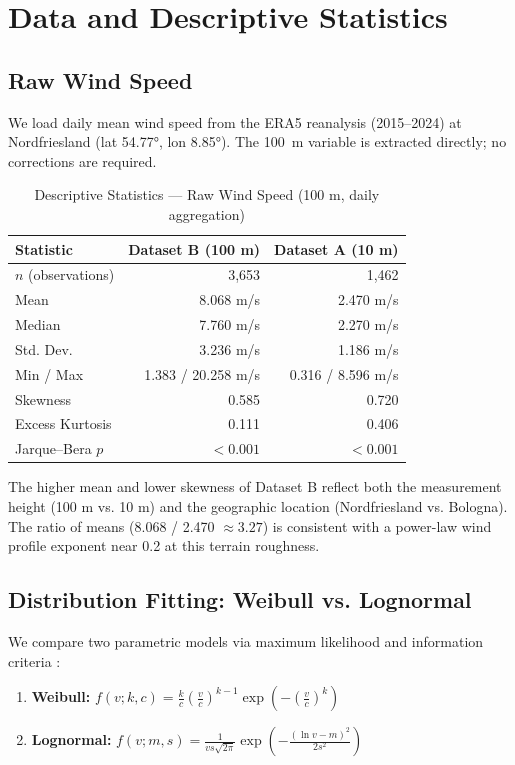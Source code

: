 \documentclass[11pt]{article}
\begin{document}
\section{Data and Descriptive Statistics}

\subsection{Raw Wind Speed}

We load daily mean wind speed from the ERA5 reanalysis (2015--2024) at Nordfriesland (lat 54.77°, lon 8.85°). The 100~m variable is extracted directly; no corrections are required.

\begin{table}[h]
\centering
\caption{Descriptive Statistics --- Raw Wind Speed (100 m, daily aggregation)}
\label{tab:rawstats}
\begin{tabular}{lrr}
\toprule
\textbf{Statistic} & \textbf{Dataset B (100 m)} & \textbf{Dataset A (10 m)} \\
\midrule
$n$ (observations) & 3,653 & 1,462 \\
Mean & 8.068 m/s & 2.470 m/s \\
Median & 7.760 m/s & 2.270 m/s \\
Std. Dev. & 3.236 m/s & 1.186 m/s \\
Min / Max & 1.383 / 20.258 m/s & 0.316 / 8.596 m/s \\
Skewness & 0.585 & 0.720 \\
Excess Kurtosis & 0.111 & 0.406 \\
Jarque--Bera $p$ & $< 0.001$ & $< 0.001$ \\
\bottomrule
\end{tabular}
\end{table}

The higher mean and lower skewness of Dataset B reflect both the measurement height (100 m vs. 10 m) and the geographic location (Nordfriesland vs. Bologna). The ratio of means (8.068 / 2.470 $\approx 3.27$) is consistent with a power-law wind profile exponent near 0.2 at this terrain roughness.

\subsection{Distribution Fitting: Weibull vs. Lognormal}

We compare two parametric models via maximum likelihood and information criteria \citep{Garcia1998, Tuller1984}:

\begin{enumerate}
  \item \textbf{Weibull:} $f(v; k, c) = \frac{k}{c}\left(\frac{v}{c}\right)^{k-1} \exp\left(-\left(\frac{v}{c}\right)^k\right)$
  \item \textbf{Lognormal:} $f(v; m, s) = \frac{1}{v s \sqrt{2\pi}} \exp\left(-\frac{(\ln v - m)^2}{2s^2}\right)$
\end{enumerate}
\end{document}

